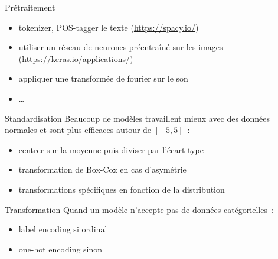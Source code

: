 \begin{frame}{Prétraitement}
  \begin{itemize}
  \item tokenizer, POS-tagger le texte (\url{https://spacy.io/})
  \item utiliser un réseau de neurones préentraîné sur les images
    (\url{https://keras.io/applications/})
  \item appliquer une transformée de fourier sur le son
  \item …
  \end{itemize}
\end{frame}

\begin{frame}{Standardisation}
  Beaucoup de modèles travaillent mieux avec des données normales et
  sont plus efficaces autour de $[-5, 5]$ :
  \begin{itemize}
  \item centrer sur la moyenne puis diviser par l'écart-type
  \item transformation de Box-Cox en cas d'asymétrie
  \item transformations spécifiques en fonction de la distribution
  \end{itemize}
\end{frame}

\begin{frame}{Transformation}
  Quand un modèle n'accepte pas de données catégorielles :
  \begin{itemize}
  \item label encoding si ordinal
  \item one-hot encoding sinon
  \end{itemize}
\end{frame}

